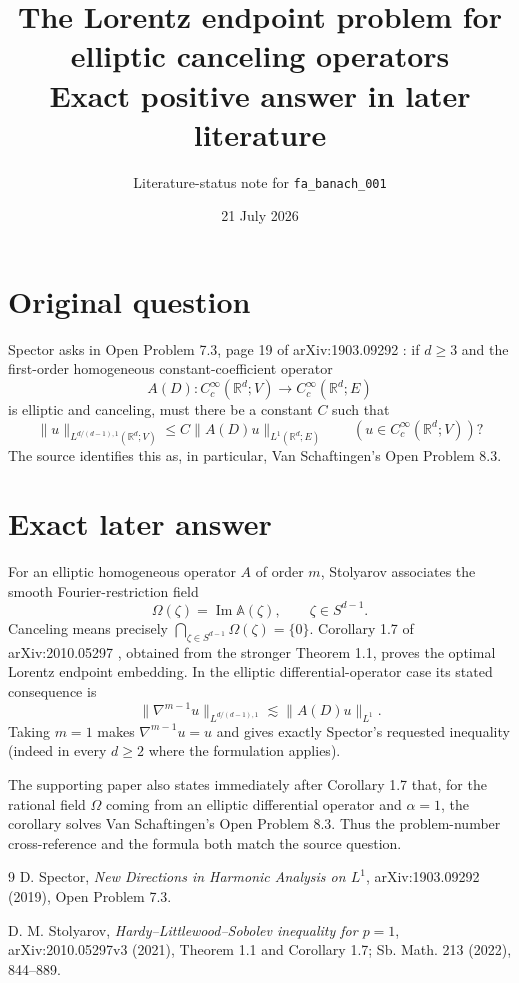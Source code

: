 \documentclass[10pt]{article}
\title{The Lorentz endpoint problem for elliptic canceling operators\\
\large Exact positive answer in later literature}
\author{Literature-status note for \texttt{fa\_banach\_001}}
\date{21 July 2026}
\begin{document}
\maketitle

\begin{center}
\end{center}

\section*{Original question}

Spector asks in Open Problem 7.3, page 19 of arXiv:1903.09292 \cite{Spector}:
if $d\geq 3$ and the first-order homogeneous constant-coefficient operator
\[
 A(D):C_c^\infty(\mathbb R^d;V)\longrightarrow
 C_c^\infty(\mathbb R^d;E)
\]
is elliptic and canceling, must there be a constant $C$ such that
\[
 \|u\|_{L^{d/(d-1),1}(\mathbb R^d;V)}
 \leq C\|A(D)u\|_{L^1(\mathbb R^d;E)}
 \qquad(u\in C_c^\infty(\mathbb R^d;V))?
\]
The source identifies this as, in particular, Van Schaftingen's Open
Problem 8.3.

\section*{Exact later answer}

For an elliptic homogeneous operator $A$ of order $m$, Stolyarov associates
the smooth Fourier-restriction field
\[
 \Omega(\zeta)=\operatorname{Im}\mathbb A(\zeta),
 \qquad \zeta\in S^{d-1}.
\]
Canceling means precisely
$\bigcap_{\zeta\in S^{d-1}}\Omega(\zeta)=\{0\}$.
Corollary 1.7 of arXiv:2010.05297 \cite{Stolyarov}, obtained from the stronger
Theorem 1.1, proves the optimal Lorentz endpoint embedding.  In the elliptic
differential-operator case its stated consequence is
\[
 \|\nabla^{m-1}u\|_{L^{d/(d-1),1}}
 \lesssim \|A(D)u\|_{L^1}.
\]
Taking $m=1$ makes $\nabla^{m-1}u=u$ and gives exactly Spector's requested
inequality (indeed in every $d\geq2$ where the formulation applies).

The supporting paper also states immediately after Corollary 1.7 that, for
the rational field $\Omega$ coming from an elliptic differential operator and
$\alpha=1$, the corollary solves Van Schaftingen's Open Problem 8.3. Thus the
problem-number cross-reference and the formula both match the source question.

\begin{thebibliography}{9}
D. Spector,
\emph{New Directions in Harmonic Analysis on $L^1$},
arXiv:1903.09292 (2019), Open Problem 7.3.

D. M. Stolyarov,
\emph{Hardy--Littlewood--Sobolev inequality for $p=1$},
arXiv:2010.05297v3 (2021), Theorem 1.1 and Corollary 1.7;
Sb. Math. 213 (2022), 844--889.
\end{thebibliography}
\end{document}
